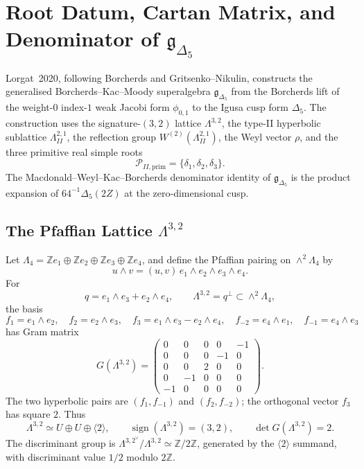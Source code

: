 \providecommand{\ggd}{\mathfrak{g}_{\Delta_5}}
\providecommand{\Lambdaa}{\Lambda^{3,2}}
\providecommand{\Lambdab}{\Lambda^{2,1}}
\providecommand{\Lambdac}{\Lambda^{2,1}_{II}}
\providecommand{\WII}{W^{(2)}(\Lambdac)}
\providecommand{\PII}{\mathcal{P}_{II}}
\providecommand{\PIIprim}{\mathcal{P}_{II,\mathrm{prim}}}
\providecommand{\HIV}{\mathcal{H}^{IV}_{+}}
\providecommand{\Cone}{\mathcal{C}}

\section*{Root Datum, Cartan Matrix, and Denominator of $\ggd$}
\label{sec:delta5-root-cartan}

Lorgat~2020, following Borcherds and Gritsenko--Nikulin, constructs the
generalised Borcherds--Kac--Moody superalgebra $\ggd$ from the Borcherds
lift of the weight-$0$ index-$1$ weak Jacobi form $\phi_{0,1}$ to the
Igusa cusp form $\Delta_5$.  The construction uses the signature-$(3,2)$
lattice $\Lambdaa$, the type-II hyperbolic sublattice $\Lambdac$, the
reflection group $\WII$, the Weyl vector $\rho$, and the three primitive
real simple roots
\[
\PIIprim=\{\delta_1,\delta_2,\delta_3\}.
\]
The Macdonald--Weyl--Kac--Borcherds denominator identity of $\ggd$ is
the product expansion of $64^{-1}\Delta_5(2Z)$ at the zero-dimensional
cusp.

\subsection*{The Pfaffian Lattice $\Lambdaa$}

Let $\Lambda_4=\mathbb{Z}e_1\oplus\mathbb{Z}e_2\oplus
\mathbb{Z}e_3\oplus\mathbb{Z}e_4$, and define the Pfaffian pairing on
$\wedge^2\Lambda_4$ by
\[
u\wedge v=(u,v)\,e_1\wedge e_2\wedge e_3\wedge e_4 .
\]
For
\[
q=e_1\wedge e_3+e_2\wedge e_4,
\qquad
\Lambdaa=q^\perp\subset\wedge^2\Lambda_4,
\]
the basis
\begin{equation}
f_1=e_1\wedge e_2,\quad
f_2=e_2\wedge e_3,\quad
f_3=e_1\wedge e_3-e_2\wedge e_4,\quad
f_{-2}=e_4\wedge e_1,\quad
f_{-1}=e_4\wedge e_3
\label{eq:delta5-pfaffian-basis}
\end{equation}
has Gram matrix
\begin{equation}
G(\Lambdaa)=
\begin{pmatrix}
0&0&0&0&-1\\
0&0&0&-1&0\\
0&0&2&0&0\\
0&-1&0&0&0\\
-1&0&0&0&0
\end{pmatrix}.
\label{eq:delta5-gram-lambda32}
\end{equation}
The two hyperbolic pairs are $(f_1,f_{-1})$ and $(f_2,f_{-2})$; the
orthogonal vector $f_3$ has square $2$.  Thus
\[
\Lambdaa\simeq U\oplus U\oplus\langle 2\rangle,
\qquad
\operatorname{sign}(\Lambdaa)=(3,2),
\qquad
\det G(\Lambdaa)=2.
\]
The discriminant group is $\Lambdaa^\vee/\Lambdaa\simeq\mathbb{Z}/2\mathbb{Z}$,
generated by the $\langle2\rangle$ summand, with discriminant value
$1/2$ modulo $2\mathbb{Z}$.

